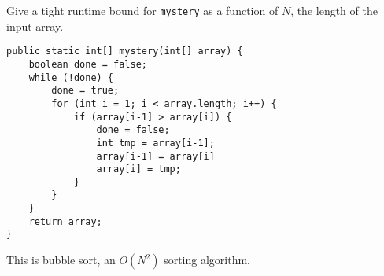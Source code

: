 \question Give a tight runtime bound for \texttt{mystery} as a function of $N$, the length of the input array.

\begin{lstlisting}
public static int[] mystery(int[] array) {
    boolean done = false;
    while (!done) {
        done = true;
        for (int i = 1; i < array.length; i++) {
            if (array[i-1] > array[i]) {
                done = false;
                int tmp = array[i-1];
                array[i-1] = array[i]
                array[i] = tmp;
            }
        }
    }
    return array;
}
\end{lstlisting}

\begin{solution}[0.5in]
This is bubble sort, an $O(N^2)$ sorting algorithm.
\end{solution}
